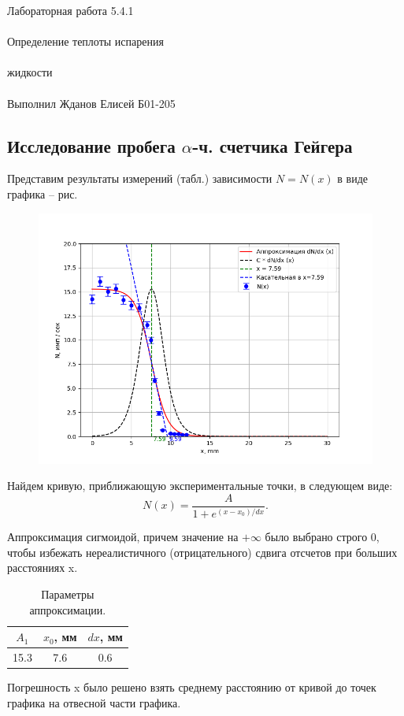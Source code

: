 \documentclass{astroedu-lab}
\begin{document}
\begin{problem}{\huge Лабораторная работа 5.4.1\\\\Определение теплоты испарения\\\\жидкости\\\\Выполнил Жданов Елисей Б01-205}
		\subsection{Исследование пробега $\alpha$-ч. счетчика Гейгера}	
		Представим результаты измерений (табл.) зависимости $N=N(x)$ в виде графика -- рис. 
		
		\begin{figure}[h!]
		\centering
			\includegraphics[scale=0.5]{Figure_1.png}
		\end{figure}
	
		Найдем кривую, приближающую экспериментальные точки, в следующем виде:
		\begin{equation*}
			N (x) = \frac{A}{1+e^{(x-x_0)/dx}}.
		\end{equation*}
		
Аппроксимация сигмоидой, причем значение на $+\infty$ было выбрано строго 0, чтобы избежать нереалистичного (отрицательного) сдвига отсчетов при больших расстояниях x.
	
	
		\begin{table}[H]
			\caption{Параметры аппроксимации.}
			\label{tab:pfrfmetry1}
			\centering
			\begin{tabular}{|c|c|c|}
				\hline
				$A_1$ & $x_0$, мм & $dx$, мм \\ \hline
				15.3 & 7.6   & 0.6           \\ \hline
			\end{tabular}
		\end{table}
		
Погрешность x было решено взять среднему расстоянию от кривой до точек графика на отвесной части графика.
	

\end{problem}
\end{document}
